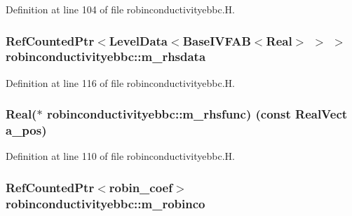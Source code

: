 Definition at line 104 of file robinconductivityebbc.\+H.

\subsubsection[{\texorpdfstring{m\+\_\+rhsdata}{m_rhsdata}}]{\setlength{\rightskip}{0pt plus 5cm}Ref\+Counted\+Ptr$<$Level\+Data$<$Base\+I\+V\+F\+AB$<$Real$>$ $>$ $>$ robinconductivityebbc\+::m\+\_\+rhsdata\hspace{0.3cm}{\ttfamily [protected]}}\hypertarget{classrobinconductivityebbc_a79ae0ec54f3385278cc0910b37c69e0b}{}\label{classrobinconductivityebbc_a79ae0ec54f3385278cc0910b37c69e0b}


Definition at line 116 of file robinconductivityebbc.\+H.

\subsubsection[{\texorpdfstring{m\+\_\+rhsfunc}{m_rhsfunc}}]{\setlength{\rightskip}{0pt plus 5cm}Real($\ast$ robinconductivityebbc\+::m\+\_\+rhsfunc) (const Real\+Vect a\+\_\+pos)\hspace{0.3cm}{\ttfamily [protected]}}\hypertarget{classrobinconductivityebbc_af250e96cbbf26f1500d61e242f445f95}{}\label{classrobinconductivityebbc_af250e96cbbf26f1500d61e242f445f95}


Definition at line 110 of file robinconductivityebbc.\+H.

\subsubsection[{\texorpdfstring{m\+\_\+robinco}{m_robinco}}]{\setlength{\rightskip}{0pt plus 5cm}Ref\+Counted\+Ptr$<${\bf robin\+\_\+coef}$>$ robinconductivityebbc\+::m\+\_\+robinco\hspace{0.3cm}{\ttfamily [protected]}}\hypertarget{classrobinconductivityebbc_ae5c6e3aa684995004943ce801abb13a5}{}\label{classrobinconductivityebbc_ae5c6e3aa684995004943ce801abb13a5}


